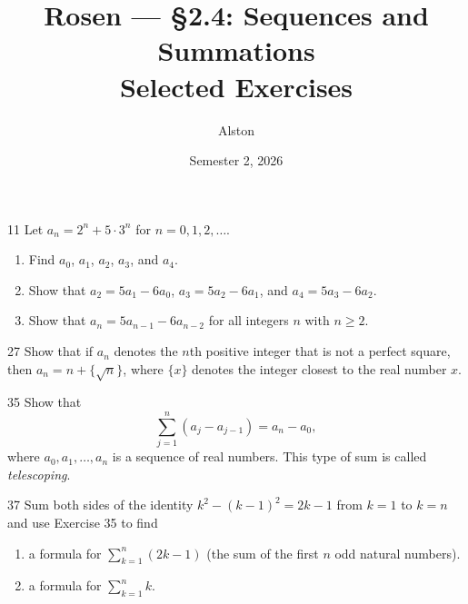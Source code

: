 \documentclass[11pt]{article}
\title{Rosen --- \S 2.4: Sequences and Summations\\ \large Selected Exercises}
\author{Alston}
\date{Semester 2, 2026}
\begin{document}
\maketitle

\begin{exercise}{11}
    Let $a_n = 2^n + 5 \cdot 3^n$ for $n = 0, 1, 2, \dots$.
    \begin{enumerate}[label=(\alph*)]
        \item Find $a_0$, $a_1$, $a_2$, $a_3$, and $a_4$.
        \item Show that $a_2 = 5a_1 - 6a_0$, $a_3 = 5a_2 - 6a_1$, and
        $a_4 = 5a_3 - 6a_2$.
        \item Show that $a_n = 5a_{n-1} - 6a_{n-2}$ for all integers $n$
        with $n \geq 2$.
    \end{enumerate}
\end{exercise}

\begin{exercise}{27}
    Show that if $a_n$ denotes the $n$th positive integer that is not a
    perfect square, then $a_n = n + \{\sqrt{n}\}$, where $\{x\}$ denotes
    the integer closest to the real number $x$.
\end{exercise}

\begin{exercise}{35}
    Show that
    \[
    \sum_{j=1}^{n} (a_j - a_{j-1}) = a_n - a_0,
    \]
    where $a_0, a_1, \dots, a_n$ is a sequence of real numbers. This
    type of sum is called \emph{telescoping}.
\end{exercise}

\begin{exercise}{37}
    Sum both sides of the identity $k^2 - (k-1)^2 = 2k - 1$ from $k = 1$
    to $k = n$ and use Exercise 35 to find
    \begin{enumerate}[label=(\alph*)]
        \item a formula for $\displaystyle\sum_{k=1}^{n} (2k-1)$ (the
        sum of the first $n$ odd natural numbers).
        \item a formula for $\displaystyle\sum_{k=1}^{n} k$.
    \end{enumerate}
\end{exercise}
\end{document}
